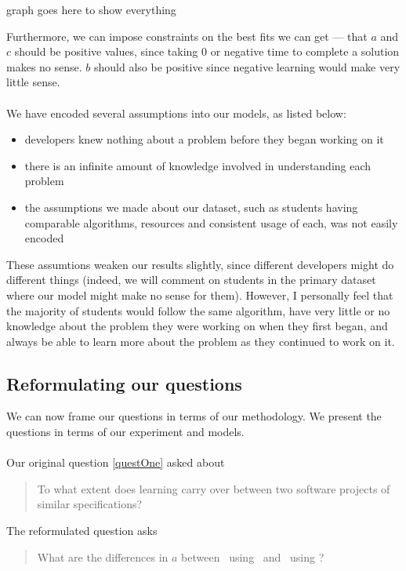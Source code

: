 \FIXME graph goes here to show everything

Furthermore, we can impose constraints on the best fits we can get --- that $a$
and $c$ should be positive values, since taking 0 or negative time to complete a
solution makes no sense.
$b$ should also be positive since negative learning would make very little
sense.\\
\\
We have encoded several assumptions into our models, as listed below:
\begin{itemize}
  \item developers knew nothing about a problem before they began working on it
  \item there is an infinite amount of knowledge involved in understanding each
  problem
  \item the assumptions we made about our dataset, such as students having
  comparable algorithms, resources and consistent usage of each, was not easily
  encoded
\end{itemize}

These assumtions weaken our results slightly, since different developers might
do different things (indeed, we will comment on students in the primary
dataset where our model might make no sense for them).
However, I personally feel that the majority of students would follow the same
algorithm, have very little or no knowledge about the problem they were working
on when they first began, and always be able to learn more about the problem as
they continued to work on it.

\subsection{Reformulating our questions} \label{subsecReform}

We can now frame our questions in terms of our methodology.
We present the questions in terms of our experiment and models.\\
\\
Our original question \ref{questOne} asked about 
\begin{quote}
  To what extent does learning carry over between two software projects of similar
  specifications?
\end{quote}

The reformulated question asks
\begin{quote}
  What are the differences in $a$ between \PO\ using \LA\ and \PT\ using \LA?
\end{quote}\label{qq1}

